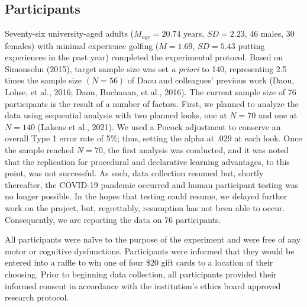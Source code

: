 \documentclass[
  english,
  man,floatsintext]{apa7}
\begin{document}
\hypertarget{participants}{%
\subsection{Participants}\label{participants}}

Seventy-six university-aged adults (\(M_{age}= 20.74\) years, \(SD = 2.23\), 46 males, 30 females) with minimal experience golfing (\(M = 1.69\), \(SD = 5.43\) putting experiences in the past year) completed the experimental protocol. Based on Simonsohn (2015), target sample size was set \emph{a priori} to 140, representing 2.5 times the sample size \((N = 56)\) of Daou and colleagues' previous work (Daou, Lohse, et al., 2016; Daou, Buchanan, et al., 2016). The current sample size of 76 participants is the result of a number of factors. First, we planned to analyze the data using sequential analysis with two planned looks, one at \(N = 70\) and one at \(N = 140\) (Lakens et al., 2021). We used a Pocock adjustment to conserve an overall Type 1 error rate of 5\%; thus, setting the alpha at \(.029\) at each look. Once the sample reached \(N = 70\), the first analysis was conducted, and it was noted that the replication for procedural and declarative learning advantages, to this point, was not successful. As such, data collection resumed but, shortly thereafter, the COVID-19 pandemic occurred and human participant testing was no longer possible. In the hopes that testing could resume, we delayed further work on the project, but, regrettably, resumption has not been able to occur. Consequently, we are reporting the data on 76 participants.

All participants were naïve to the purpose of the experiment and were free of any motor or cognitive dysfunctions. Participants were informed that they would be entered into a raffle to win one of four \$20 gift cards to a location of their choosing. Prior to beginning data collection, all participants provided their informed consent in accordance with the institution's ethics board approved research protocol.
\end{document}
